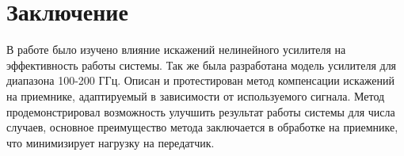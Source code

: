 \documentclass{unn}
\begin{document}
\section{Заключение}
В работе было изучено влияние искажений нелинейного усилителя на
эффективность работы системы. Так же была разработана модель усилителя для
диапазона 100-200 ГГц. Описан и протестирован метод компенсации искажений
на приемнике, адаптируемый в зависимости от используемого сигнала. Метод
продемонстрировал возможность улучшить результат работы системы для числа
случаев, основное преимущество метода заключается в обработке на приемнике,
что минимизирует нагрузку на передатчик.

\newpage
{\footnotesize
\printbibliography
}
\end{document}

